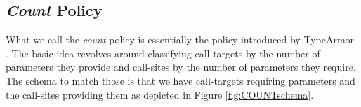\subsection{\emph{Count} Policy}
\label{section:countpolicy}
What we call the \emph{count} policy is essentially the policy introduced by TypeArmor \cite{veen:typearmor}. 
The basic idea revolves around classifying call-targets by the number of parameters they provide and call-sites 
by the number of parameters they require. The schema to match those is that we have call-targets requiring 
parameters and the call-sites providing them as depicted in Figure \ref{fig:COUNTschema}.
%
%
%
%
%
%
%
%
%
%
%
%
%
%
%

